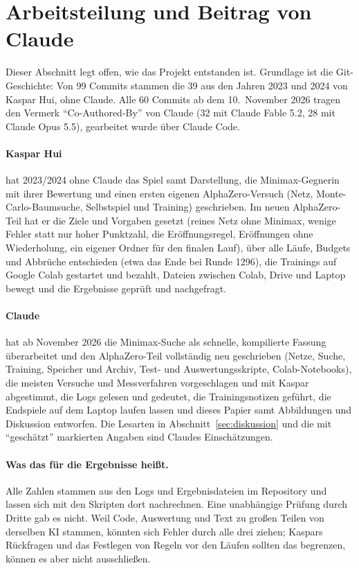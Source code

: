 \documentclass[11pt,a4paper]{article}
\begin{document}
\section{Arbeitsteilung und Beitrag von Claude}
\label{sec:beitrag}

Dieser Abschnitt legt offen, wie das Projekt entstanden ist. Grundlage ist die Git-Geschichte: Von 99
Commits stammen die 39 aus den Jahren 2023 und 2024 von Kaspar Hui, ohne Claude. Alle 60 Commits ab dem
10.~November 2026 tragen den Vermerk \enquote{Co-Authored-By} von Claude (32 mit Claude Fable 5.2, 28 mit
Claude Opus 5.5), gearbeitet wurde über Claude Code.

\paragraph{Kaspar Hui} hat 2023/2024 ohne Claude das Spiel samt Darstellung, die Minimax-Gegnerin mit
ihrer Bewertung und einen ersten eigenen AlphaZero-Versuch (Netz, Monte-Carlo-Baumsuche, Selbstspiel und
Training) geschrieben. Im neuen AlphaZero-Teil hat er die Ziele und Vorgaben gesetzt (reines Netz ohne Minimax, wenige
Fehler statt nur hoher Punktzahl, die Eröffnungsregel, Eröffnungen ohne Wiederholung, ein eigener Ordner für
den finalen Lauf), über alle Läufe, Budgets und Abbrüche entschieden (etwa das Ende bei Runde 1296), die
Trainings auf Google Colab gestartet und bezahlt, Dateien zwischen Colab, Drive und Laptop bewegt und die
Ergebnisse geprüft und nachgefragt.

\paragraph{Claude} hat ab November 2026 die Minimax-Suche als schnelle, kompilierte Fassung überarbeitet
und den AlphaZero-Teil vollständig neu geschrieben (Netze, Suche, Training, Speicher und Archiv, Test- und
Auswertungsskripte, Colab-Notebooks), die meisten Versuche und
Messverfahren vorgeschlagen und mit Kaspar abgestimmt, die Logs gelesen und gedeutet, die Trainingsnotizen
geführt, die Endspiele auf dem Laptop laufen lassen und dieses Papier samt Abbildungen und Diskussion
entworfen. Die Lesarten in Abschnitt~\ref{sec:diskussion} und die mit \enquote{geschätzt} markierten Angaben sind Claudes
Einschätzungen.

\paragraph{Was das für die Ergebnisse heißt.} Alle Zahlen stammen aus den Logs und Ergebnisdateien im
Repository und lassen sich mit den Skripten dort nachrechnen. Eine unabhängige Prüfung durch Dritte gab es
nicht. Weil Code, Auswertung und Text zu großen Teilen von derselben KI stammen, könnten sich Fehler durch
alle drei ziehen; Kaspars Rückfragen und das Festlegen von Regeln vor den Läufen sollten das begrenzen, können
es aber nicht ausschließen.
\end{document}
